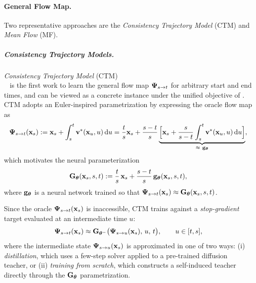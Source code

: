 

\paragraph{General Flow Map.} Two representative approaches are the \emph{Consistency Trajectory Model} (CTM) and \emph{Mean Flow} (MF).
\subparagraph{Consistency Trajectory Models.} \emph{Consistency Trajectory Model} (CTM)\\~\citep{kim2023consistency} is the first work to learn the general flow map ${\bm{\Psi}}_{s\to t}$ for arbitrary start and end times, and can be viewed as a concrete instance under the unified objective of . CTM adopts an Euler-inspired parametrization by expressing the oracle flow map as
\begin{align*}
{\bm{\Psi}}_{s\to t}({\mathbf{x}}_s)
:= {\mathbf{x}}_s + \int_s^t {\mathbf{v}}^*({\mathbf{x}}_u,u)\mathop{}\!\mathrm{d} u 
= \frac{t}{s} {\mathbf{x}}_s
+ \frac{s-t}{s}
\underbrace{\Big[{\mathbf{x}}_s + \frac{s}{s-t} \int_s^t {\mathbf{v}}^*({\mathbf{x}}_u,u) \mathop{}\!\mathrm{d} u\Big]}_{\approx~{\mathbf{g}}_{{\bm{\theta}}}},
\end{align*}
which motivates the neural parameterization
\[
{\mathbf{G}}_{{\bm{\theta}}}({\mathbf{x}}_s,s,t)
:= \frac{t}{s}\,{\mathbf{x}}_s + \frac{s-t}{s}\,{\mathbf{g}}_{\bm{\theta}}({\mathbf{x}}_s,s,t),
\]
where ${\mathbf{g}}_{\bm{\theta}}$ is a neural network trained so that ${\bm{\Psi}}_{s\to t}({\mathbf{x}}_s)\approx {\mathbf{G}}_{{\bm{\theta}}}({\mathbf{x}}_s,s,t)$.

Since the oracle ${\bm{\Psi}}_{s\to t}({\mathbf{x}}_s)$ is inaccessible, CTM trains against a \emph{stop-gradient} target evaluated at an intermediate time $u$:
\[
{\bm{\Psi}}_{s\to t}({\mathbf{x}}_s)
 \approx 
{\mathbf{G}}_{{\bm{\theta}}^-} \big({\bm{\Psi}}_{s\to u}({\mathbf{x}}_s),\,u,\,t\big),
\qquad u\in[t,s],
\]
where the intermediate state ${\bm{\Psi}}_{s\to u}({\mathbf{x}}_s)$ is approximated in one of
two ways: (i) \emph{distillation}, which uses a few-step solver applied to a
pre-trained diffusion teacher, or (ii) \emph{training from scratch}, which
constructs a self-induced teacher directly through the ${\mathbf{G}}_{\bm{\theta}}$
parametrization.


